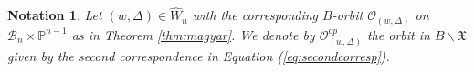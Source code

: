 \documentclass[12pt]{amsart}
\numberwithin{equation}{section}
\newtheorem{nota}[thm]{Notation}
\newcommand{\cW}{{ W}}
\newcommand{\fb}{\mbox{${\mathfrak b}$}}
\newcommand{\B}{\mathcal{B}}
\begin{document}
 \begin{nota}\label{nota:biggerop}
Let $(w,\Delta)\in\widehat{\cW}_{n}$ with the corresponding $B$-orbit $\mathcal{O}_{(w,\Delta)}$ on $\B_{n}\times\mathbb{P}^{n-1}$ as in Theorem \ref{thm:magyar}.  We denote  by $\mathcal{O}_{(w,\Delta)}^{op}$ the orbit in $B\backslash\mathfrak{X}$ given by the second correspondence in Equation (\ref{eq:secondcorresp}). 
\end{nota}
 
\end{document}
